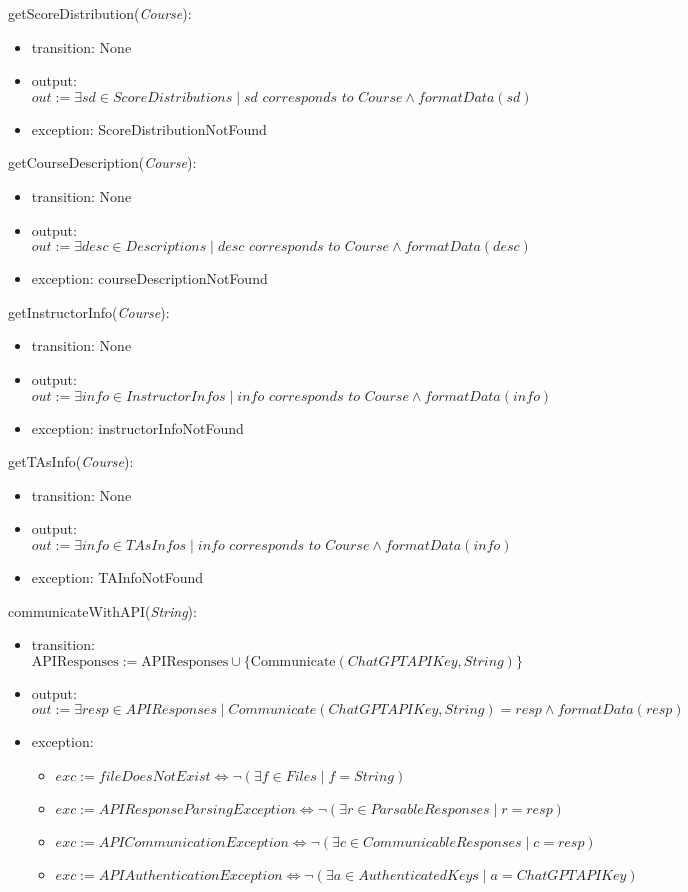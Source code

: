 \documentclass[12pt, titlepage]{article}
\begin{document}
\begin{itemize}
\noindent getScoreDistribution(\textit{Course}):
\begin{itemize}
\item transition: None
\item output: $out := \mathit{\exists sd \in ScoreDistributions \mid sd \text{ corresponds to } Course \land formatData(sd)}$
\item exception: ScoreDistributionNotFound
\end{itemize}

\noindent getCourseDescription(\textit{Course}):
\begin{itemize}
\item transition: None
\item output: $out := \mathit{\exists desc \in Descriptions \mid desc \text{ corresponds to } Course \land formatData(desc)}$
\item exception: courseDescriptionNotFound
\end{itemize}

\noindent getInstructorInfo(\textit{Course}):
\begin{itemize}
\item transition: None
\item output: $out := \mathit{\exists info \in InstructorInfos \mid info \text{ corresponds to } Course \land formatData(info)}$
\item exception: instructorInfoNotFound
\end{itemize}

\noindent getTAsInfo(\textit{Course}):
\begin{itemize}
\item transition: None
\item output: $out := \mathit{\exists info \in TAsInfos \mid info \text{ corresponds to } Course \land formatData(info)}$
\item exception: TAInfoNotFound
\end{itemize}

\noindent communicateWithAPI(\textit{String}):
\begin{itemize}
\item transition: \( \text{APIResponses} := \text{APIResponses} \cup \{ \text{Communicate}(ChatGPTAPIKey, String) \} \)
\item output: $out := \mathit{\exists resp \in APIResponses \mid Communicate(ChatGPTAPIKey, String) = resp \land formatData(resp)}$
\item exception: 
    \begin{itemize}
        \item $exc := \mathit{fileDoesNotExist} \iff \lnot (\exists f \in Files \mid f = String)$
        \item $exc := \mathit{APIResponseParsingException} \iff \lnot (\exists r \in ParsableResponses \mid r = resp)$
        \item $exc := \mathit{APICommunicationException} \iff \lnot (\exists c \in CommunicableResponses \mid c = resp)$
        \item $exc := \mathit{APIAuthenticationException} \iff \lnot (\exists a \in AuthenticatedKeys \mid a = ChatGPTAPIKey)$
    \end{itemize}
\end{itemize}



\end{itemize}
\end{document}
